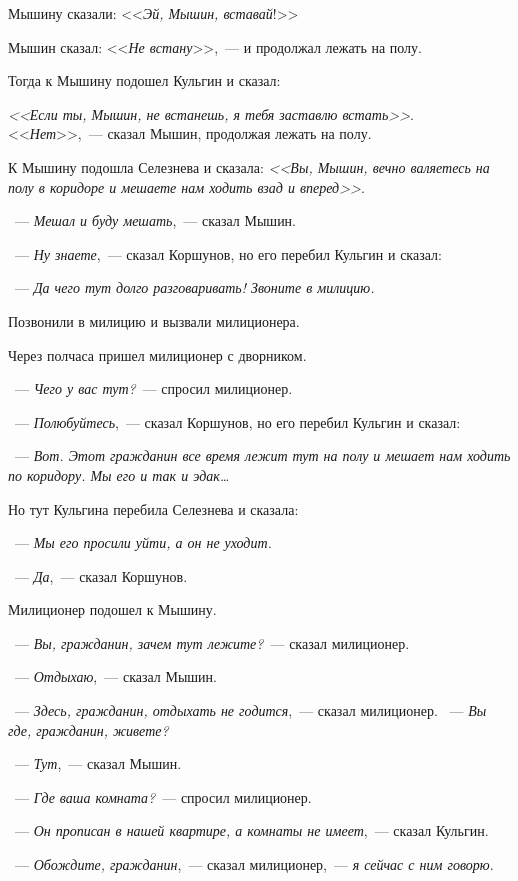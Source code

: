 Мышину сказали: <<\textit{Эй, Мышин, вставай}!>>

Мышин сказал: <<\textit{Не встану}>>,~--- и продолжал лежать на полу.

Тогда к Мышину подошел Кульгин и сказал:

\textit{<<Если ты, Мышин, не встанешь, я тебя заставлю встать>>}.
<<\textit{Нет}>>,~--- сказал Мышин, продолжая лежать на полу.

К Мышину подошла Селезнева и сказала:
\textit{<<Вы, Мышин, вечно валяетесь на полу в коридоре и мешаете нам ходить взад и вперед>>}.

~--- \textit{Мешал и буду мешать},~--- сказал Мышин.

~--- \textit{Ну знаете},~--- сказал Коршунов, но его перебил Кульгин и сказал:

~--- \textit{Да чего тут долго разговаривать! Звоните в милицию.}

Позвонили в милицию и вызвали милиционера.

Через полчаса пришел милиционер с дворником.

~--- \textit{Чего у вас тут?}~--- спросил милиционер.

~--- \textit{Полюбуйтесь},~--- сказал Коршунов, но его перебил Кульгин и сказал:

~--- \textit{Вот. Этот гражданин все время лежит тут на полу и мешает нам ходить по коридору. Мы его и так и эдак\dots}

Но тут Кульгина перебила Селезнева и сказала:

~--- \textit{Мы его просили уйти, а он не уходит.}

~--- \textit{Да},~--- сказал Коршунов.

Милиционер подошел к Мышину.

~--- \textit{Вы, гражданин, зачем тут лежите?}~--- сказал милиционер.

~--- \textit{Отдыхаю},~--- сказал Мышин.

~--- \textit{Здесь, гражданин, отдыхать не годится},~--- сказал милиционер. ~--- \textit{Вы где, гражданин, живете?}

~--- \textit{Тут},~--- сказал Мышин.

~--- \textit{Где ваша комната?}~--- спросил милиционер.

~--- \textit{Он прописан в нашей квартире, а комнаты не имеет},~--- сказал Кульгин.

~--- \textit{Обождите, гражданин},~--- сказал милиционер,~--- \textit{я сейчас с ним говорю}.

